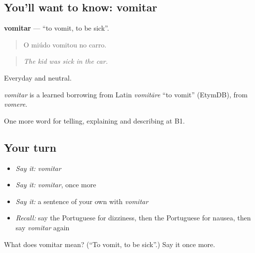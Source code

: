 \subsection*{You'll want to know: vomitar}
\textbf{vomitar} — \textquotedblleft{}to vomit, to be sick\textquotedblright{}.

\begin{quote}
O miúdo vomitou no carro.
\end{quote}

\begin{quote}
\emph{The kid was sick in the car.}
\end{quote}

Everyday and neutral.

\begin{cousinweb}
\emph{vomitar} is a learned borrowing from Latin \emph{vomitāre} \textquotedblleft{}to vomit\textquotedblright{} (EtymDB), from \emph{vomere}.
\end{cousinweb}

\begin{grammarlens}[title={What you've built}]
One more word for telling, explaining and describing at B1.
\end{grammarlens}

\subsection*{Your turn}
\begin{itemize}
\raggedright
  \item \emph{Say it:} \emph{vomitar}
  \item \emph{Say it:} \emph{vomitar}, once more
  \item \emph{Say it:} a sentence of your own with \emph{vomitar}
  \item \emph{Recall:} say the Portuguese for dizziness, then the Portuguese for nausea, then say \emph{vomitar} again
\end{itemize}

\begin{tcolorbox}[breakable,colback=teal!4,colframe=teal!35!black,title={Before you move on}]
What does vomitar mean? (\textquotedblleft{}To vomit, to be sick\textquotedblright{}.) Say it once more.
\end{tcolorbox}
